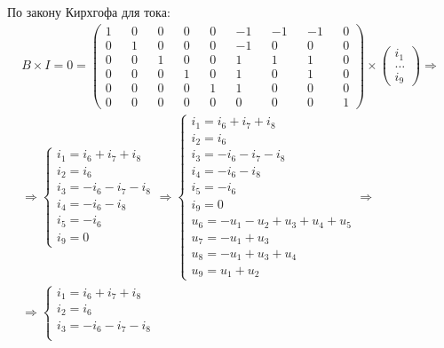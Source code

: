 \documentclass{article}
\begin{document}
По закону Кирхгофа для тока:
\begin{align*}
    B \times I = 0 = 
    \begin{pmatrix}
        1 && 0 && 0 && 0 && 0 && -1 && -1 && -1 && 0 \\
        0 && 1 && 0 && 0 && 0 && -1 &&  0 &&  0 && 0 \\
        0 && 0 && 1 && 0 && 0 &&  1 &&  1 &&  1 && 0 \\
        0 && 0 && 0 && 1 && 0 &&  1 &&  0 &&  1 && 0 \\
        0 && 0 && 0 && 0 && 1 &&  1 &&  0 &&  0 && 0 \\
        0 && 0 && 0 && 0 && 0 &&  0 &&  0 &&  0 && 1
    \end{pmatrix}
    \times
    \begin{pmatrix}
        i_1 \\ \dots \\ i_9
    \end{pmatrix}
    \Longrightarrow \\ \Longrightarrow
    \begin{cases}
        i_1 = i_6 + i_7 + i_8 \\
        i_2 = i_6 \\
        i_3 = -i_6 - i_7 - i_8 \\
        i_4 = -i_6 - i_8 \\
        i_5 = -i_6 \\
        i_9 = 0
    \end{cases}
    \Longrightarrow
    \begin{cases}
        i_1 = i_6 + i_7 + i_8 \\
        i_2 = i_6 \\
        i_3 = -i_6 - i_7 - i_8 \\
        i_4 = -i_6 - i_8 \\
        i_5 = -i_6 \\
        i_9 = 0 \\
        u_6 = -u_1 - u_2 + u_3 + u_4 + u_5 \\
        u_7 = -u_1 + u_3 \\
        u_8 = -u_1 + u_3 + u_4 \\
        u_9 = u_1 + u_2
    \end{cases}
    \Longrightarrow \\ \Longrightarrow
    \begin{cases}
        i_1 = i_6 + i_7 + i_8 \\
        i_2 = i_6 \\
        i_3 = -i_6 - i_7 - i_8 \\

\end{cases}
\end{align*}
\end{document}
